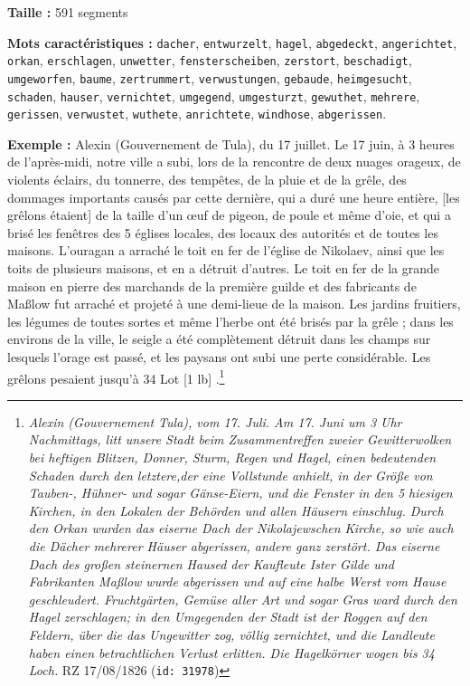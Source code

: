 \documentclass[a4paper,twoside,12pt]{article}
\begin{document}
\begin{flushleft}
\textbf{Taille :} 591 segments

\textbf{Mots caractéristiques :} \texttt{dacher}, \texttt{entwurzelt}, \texttt{hagel}, \texttt{abgedeckt}, \texttt{angerichtet}, \texttt{orkan}, \texttt{erschlagen}, \texttt{unwetter}, \texttt{fensterscheiben}, \texttt{zerstort}, \texttt{beschadigt}, \texttt{umgeworfen}, \texttt{baume}, \texttt{zertrummert}, \texttt{verwustungen}, \texttt{gebaude}, \texttt{heimgesucht}, \texttt{schaden}, \texttt{hauser}, \texttt{vernichtet}, \texttt{umgegend}, \texttt{umgesturzt}, \texttt{gewuthet}, \texttt{mehrere}, \texttt{gerissen}, \texttt{verwustet}, \texttt{wuthete}, \texttt{anrichtete}, \texttt{windhose}, \texttt{abgerissen}.
\end{flushleft}

\medskip

\noindent \textbf{Exemple :} \og Alexin (Gouvernement de Tula), du 17 juillet. Le 17 juin, à 3 heures de l'après-midi, notre ville a subi, lors de la rencontre de deux nuages orageux, de violents éclairs, du tonnerre, des tempêtes, de la pluie et de la grêle, des dommages importants causés par cette dernière, qui a duré une heure entière, [les grêlons étaient] de la taille d'un œuf de pigeon, de poule et même d'oie, et qui a brisé les fenêtres des 5 églises locales, des locaux des autorités et de toutes les maisons. L'ouragan a arraché le toit en fer de l'église de Nikolaev, ainsi que les toits de plusieurs maisons, et en a détruit d'autres. Le toit en fer de la grande maison en pierre des marchands de la première guilde et des fabricants de Maßlow fut arraché et projeté à une demi-lieue de la maison. Les jardins fruitiers, les légumes de toutes sortes et même l'herbe ont été brisés par la grêle ; dans les environs de la ville, le seigle a été complètement détruit dans les champs sur lesquels l'orage est passé, et les paysans ont subi une perte considérable. Les grêlons pesaient jusqu'à 34 Lot [1 lb] \fg{}.\footnote{\textit{Alexin (Gouvernement Tula), vom 17. Juli. Am 17. Juni um 3 Uhr Nachmittags, litt unsere Stadt beim Zusammentreffen zweier Gewitterwolken bei heftigen Blitzen, Donner, Sturm, Regen und Hagel, einen bedeutenden Schaden durch den letztere,der eine Vollstunde anhielt, in der Größe von Tauben-, Hühner- und sogar Gänse-Eiern, und die Fenster in den 5 hiesigen Kirchen, in den Lokalen der Behörden und allen Häusern einschlug. Durch den Orkan wurden das eiserne Dach der Nikolajewschen Kirche, so wie auch die Dächer mehrerer Häuser abgerissen, andere ganz zerstört. Das eiserne Dach des großen steinernen Haused der Kaufleute Ister Gilde und Fabrikanten Maßlow wurde abgerissen und auf eine halbe Werst vom Hause geschleudert. Fruchtgärten, Gemüse aller Art und sogar Gras ward durch den Hagel zerschlagen; in den Umgegenden der Stadt ist der Roggen auf den Feldern, über die das Ungewitter zog, völlig zernichtet, und die Landleute haben einen betrachtlichen Verlust erlitten. Die Hagelkörner wogen bis 34 Loch.} RZ 17/08/1826 (\texttt{id: 31978})}
\end{document}
